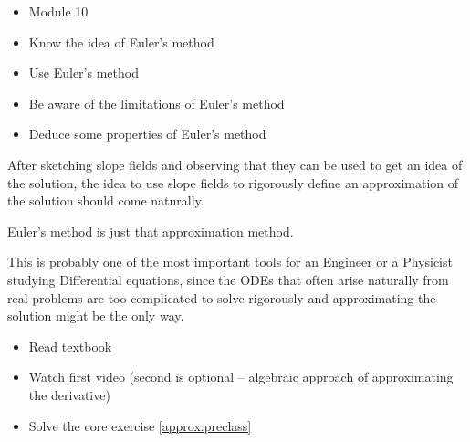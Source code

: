 \begin{lesson}


	\begin{itemize}
		\item Module 10
	\end{itemize}

	\begin{itemize}
		\item Know the idea of Euler's method
		\item Use Euler's method
		\item Be aware of the limitations of Euler's method
		\item Deduce some properties of Euler's method
	\end{itemize}
	

After sketching slope fields and observing that they can be used to get an idea of the solution, the idea to use slope fields to rigorously define an approximation of the solution should come naturally.

Euler's method is just that approximation method. 

This is probably one of the most important tools for an Engineer or a Physicist studying Differential equations, since the ODEs that often arise naturally from real problems are too complicated to solve rigorously and approximating the solution might be the only way.


\begin{itemize}
	\item Read textbook
	\item Watch first video (second is optional -- algebraic approach of approximating the derivative)
	\item Solve the core exercise \ref{approx:preclass}
\end{itemize}

\end{lesson}





